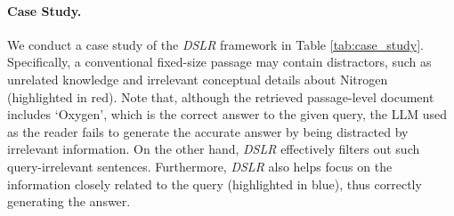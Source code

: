 
\paragraph{Case Study.}
We conduct a case study of the \textit{DSLR} framework in Table \ref{tab:case_study}. 
Specifically, a conventional fixed-size passage may contain distractors, such as unrelated knowledge and irrelevant conceptual details about Nitrogen (highlighted in red).
Note that, although the retrieved passage-level document includes `Oxygen', which is the correct answer to the given query, the LLM used as the reader fails to generate the accurate answer by being distracted by irrelevant information.
On the other hand, \textit{DSLR} effectively filters out such query-irrelevant sentences. Furthermore, \textit{DSLR} also helps focus on the information closely related to the query (highlighted in blue), thus correctly generating the answer.

